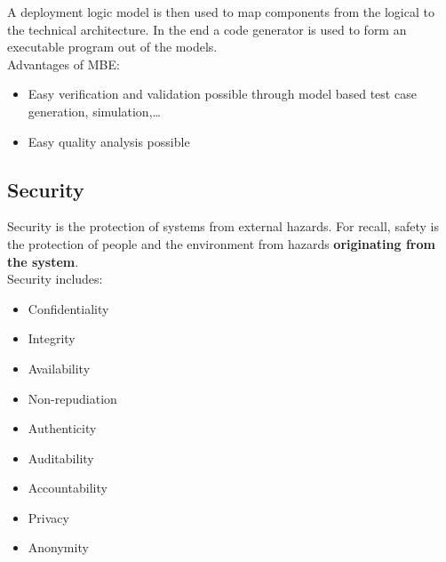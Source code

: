 A deployment logic model is then used to map components from the logical to the technical architecture.
In the end a code generator is used to form an executable program out of the models.\\

Advantages of MBE:\@
\begin{itemize}
  \item Easy verification and validation possible through model based test case generation, simulation,\ldots
  \item Easy quality analysis possible
\end{itemize}

\subsection{Security}
Security is the protection of systems from external hazards.
For recall, safety is the protection of people and the environment from hazards \textbf{originating from the system}.\\
Security includes:\\
\begin{minipage}[t]{0.49\textwidth}
    \begin{itemize}[topsep=0pt,noitemsep]
      \item Confidentiality
      \item Integrity
      \item Availability
      \item Non-repudiation
      \item Authenticity
    \end{itemize}
\end{minipage}
\begin{minipage}[t]{0.49\textwidth}
    \begin{itemize}[topsep=0pt, noitemsep]
      \item Auditability
      \item Accountability
      \item Privacy
      \item Anonymity
    \end{itemize}
\end{minipage}

